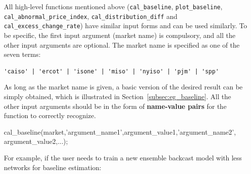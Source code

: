 \documentclass[10pt]{article}
\numberwithin{equation}{section}
\numberwithin{table}{section}
\numberwithin{figure}{section}
\begin{document}
All high-level functions mentioned above (\verb!cal_baseline!, \verb!plot_baseline!, \verb!cal_abnormal_price_index!, \verb!cal_distribution_diff! and \verb!cal_excess_change_rate!) have similar input forms and can be used similarly. To be specific, the first input argument (market name) is compulsory, and all the other input arguments are optional. The market name is specified as one of the seven terms:

\begin{center}
  \verb!'caiso' | 'ercot' | 'isone' | 'miso' | 'nyiso' | 'pjm' | 'spp'!
\end{center}

As long as the market name is given, a basic version of the desired result can be simply obtained, which is illustrated in Section~\ref{subsec:eg_baseline}. All the other input arguments should be in the form of \textbf{name-value pairs} for the function to correctly recognize.

\begin{Command}
cal_baseline(market,'argument_name1',argument_value1,'argument_name2',
argument_value2,...);
\end{Command}

For example, if the user needs to train a new ensemble backcast model with less networks for baseline estimation:

\end{document}
